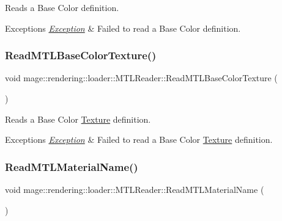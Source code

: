 Reads a Base Color definition.


\begin{DoxyExceptions}{Exceptions}
{\em \mbox{\hyperlink{classmage_1_1_exception}{Exception}}} & Failed to read a Base Color definition. \\
\hline
\end{DoxyExceptions}
\mbox{\label{classmage_1_1rendering_1_1loader_1_1_m_t_l_reader_a67198ee5158ee7d77e907f6538030aee}} 
\subsubsection{\texorpdfstring{Read\+M\+T\+L\+Base\+Color\+Texture()}{ReadMTLBaseColorTexture()}}
{\footnotesize\ttfamily void mage\+::rendering\+::loader\+::\+M\+T\+L\+Reader\+::\+Read\+M\+T\+L\+Base\+Color\+Texture (\begin{DoxyParamCaption}{ }\end{DoxyParamCaption})\hspace{0.3cm}{\ttfamily [private]}}

Reads a Base Color \mbox{\hyperlink{classmage_1_1rendering_1_1_texture}{Texture}} definition.


\begin{DoxyExceptions}{Exceptions}
{\em \mbox{\hyperlink{classmage_1_1_exception}{Exception}}} & Failed to read a Base Color \mbox{\hyperlink{classmage_1_1rendering_1_1_texture}{Texture}} definition. \\
\hline
\end{DoxyExceptions}
\mbox{\label{classmage_1_1rendering_1_1loader_1_1_m_t_l_reader_ab123422945f5937ffe484c1076a6858b}} 
\subsubsection{\texorpdfstring{Read\+M\+T\+L\+Material\+Name()}{ReadMTLMaterialName()}}
{\footnotesize\ttfamily void mage\+::rendering\+::loader\+::\+M\+T\+L\+Reader\+::\+Read\+M\+T\+L\+Material\+Name (\begin{DoxyParamCaption}{ }\end{DoxyParamCaption})\hspace{0.3cm}{\ttfamily [private]}}

